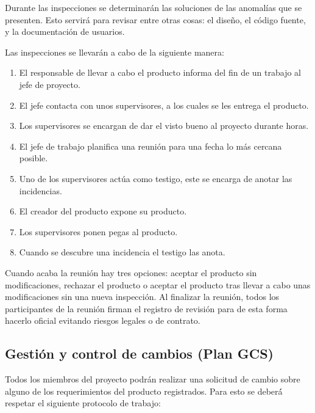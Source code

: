 Durante las inspecciones se determinarán las soluciones de las anomalías que se presenten. Esto servirá para revisar entre otras cosas: el diseño, el código fuente, y la documentación de usuarios.

Las inspecciones se llevarán a cabo de la siguiente manera:
\begin{enumerate}
	\item El responsable de llevar a cabo el producto informa del fin de un trabajo al jefe de proyecto.
	\item El jefe contacta con unos supervisores, a los cuales se les entrega el producto.
	\item Los supervisores se encargan de dar el visto bueno al proyecto durante horas.
	\item El jefe de trabajo planifica una reunión para una fecha lo más cercana posible.
	\item Uno de los supervisores actúa como testigo, este se encarga de anotar las incidencias.
	\item El creador del producto expone su producto.
	\item Los supervisores ponen pegas al producto.
	\item Cuando se descubre una incidencia el testigo las anota.
\end{enumerate}

Cuando acaba la reunión hay tres opciones: aceptar el producto sin modificaciones, rechazar el producto o aceptar el producto tras llevar a cabo unas modificaciones sin una nueva inspección.  Al finalizar la reunión, todos los participantes de la reunión firman el registro de revisión para de esta forma hacerlo oficial evitando riesgos legales o de contrato.


\subsection{Gestión y control de cambios (Plan GCS)}
Todos los miembros del proyecto podrán realizar una solicitud de cambio sobre alguno de los requerimientos del producto registrados. Para esto se deberá́ respetar el siguiente protocolo de trabajo:

